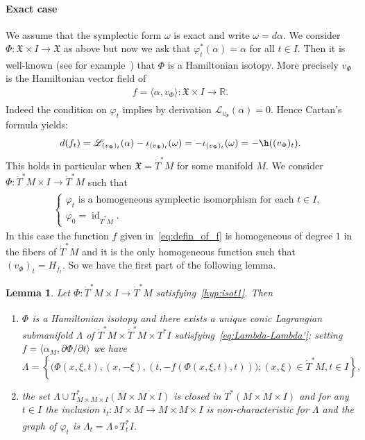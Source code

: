 \documentclass[12pt,leqno]{article}
\newtheorem{lemma}[theorem]{Lemma}
\theoremstyle{definition}
\newcommand{\R}{{\mathbb{R}}}
\def\phi{{\varphi}}
\def\shl{\mathscr{L}}
\newcommand{\symx}{{\mathfrak{X}}}
\renewcommand{\to}[1][]{\xrightarrow[]{#1}}
\newcommand{\conv}[1][]{\mathop{\circ}\limits_{#1}}
\newcommand{\cl}{\colon}
\newcommand{\bl}{\bigl(}
\newcommand{\br}{\bigr)}
\newcommand{\bnum}{\begin{enumerate}[{\rm(i)}]}
\newcommand{\enum}{\end{enumerate}}
\newcommand{\eq}{\begin{eqnarray}}
\newcommand{\eneq}{\end{eqnarray}}
\newcommand{\set}[2]{\left\{#1 \mathbin{;} #2 \right\}}
\DeclareMathOperator{\id}{id}
\newcommand{\dT}{{\dot{T}}}
\newcommand{\dTM}{{\dT}^*M}
\numberwithin{equation}{section}
\begin{document}
\paragraph{Exact case}
We assume that the symplectic form $\omega$ is exact and write $\omega =
d\alpha$. We consider $\Phi\cl \symx \times I\to \symx$ as above but now
we ask that $\phi_t^*(\alpha) =\alpha$ for all $t\in I$.
Then it is well-known (see for example~\cite[Corollary 9.19]{MDS95})
that $\Phi$ is a Hamiltonian isotopy. More precisely 
$v_\Phi$ is the Hamiltonian vector field of
\eq\label{eq:defin_of_f}
f = \langle \alpha, v_\Phi \rangle 
\cl \symx\times I\to \R.
\eneq
Indeed the condition on $\phi_t$ implies by derivation
$\shl_{v_\Phi} (\alpha) = 0$. Hence Cartan's formula
yields:
$$
d(f_t) = \shl_{(v_\Phi)_t} (\alpha)
-  \iota_{(v_\Phi)_t} (\omega) 
= -  \iota_{(v_\Phi)_t} (\omega) 
= -\h((v_\Phi)_t).
$$
This holds in particular when $\symx = \dTM$ for some manifold $M$. We
consider $\Phi\cl \dTM\times I\to \dTM$ such that 
\eq\label{hyp:isot1bis}
&&\begin{cases}
\mbox{$\phi_t$ is a homogeneous symplectic isomorphism for each $t\in I$,} \\
\phi_0 = \id_{\dTM}.
\end{cases}
\eneq
In this case the function $f$ given in~\eqref{eq:defin_of_f} is homogeneous of
degree $1$ in the fibers of $\dTM$ and it is the only homogeneous function
such that $(v_\Phi)_t = H_{f_t}$. So we have the first part of the following
lemma.
\begin{lemma}\label{lem:homog-Hamilt-isot}
Let $\Phi\cl \dTM\times I\to \dTM$ satisfying~\eqref{hyp:isot1}. Then
\bnum
\item 
$\Phi$ is a Hamiltonian isotopy and there exists a unique conic Lagrangian submanifold
$\Lambda$ of $\dTM\times \dTM\times T^*I$
satisfying~\eqref{eq:Lambda-Lambda'}{\rm:} setting
$f = \langle \alpha_M, \partial\Phi/\partial t \rangle$ we have
$$
\Lambda  = 
\set{\bl\Phi(x,\xi,t), (x, -\xi), (t, -f(\Phi(x,\xi,t),t))\br}%
{ (x,\xi)\in \dTM, t\in I},
$$
\item
the set $\Lambda\cup T^*_{M\times M\times I}(M\times M\times I)$ is
closed in $T^*(M\times M\times I)$
and for any $t\in I$ the inclusion $i_t\cl M\times M \to M\times M\times I$ is
non-characteristic for $\Lambda$ and the graph of $\phi_t$ is
$\Lambda_{t} = \Lambda\conv T^*_{t}I$.
\enum
\end{lemma}
\end{document}
